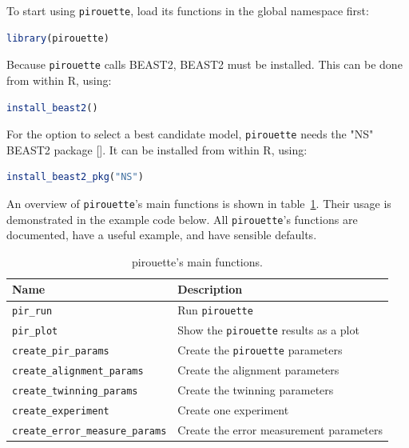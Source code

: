 \documentclass{article}
\begin{document}
To start using \verb;pirouette;, load its functions in the global namespace 
first:

\begin{lstlisting}[language=R, floatplacement=ht, frame=single]
library(pirouette)
\end{lstlisting}
Because \verb;pirouette; calls BEAST2, BEAST2 must be installed. 
This can be done from within R, using:

\begin{lstlisting}[language=R, floatplacement=ht, frame=single]
install_beast2()
\end{lstlisting}
For the option to select a best candidate model,
\verb;pirouette; needs the "NS" BEAST2 package [\cite{maturana2018model}].
It can be installed from within R, using:

\begin{lstlisting}[language=R, floatplacement=ht, frame=single]
install_beast2_pkg("NS")
\end{lstlisting}

An overview of \verb;pirouette;'s main functions is shown in 
table~\ref{tab:functions}. 
Their usage is demonstrated in the example code below.
All \verb;pirouette;'s functions are documented,
have a useful example, and have sensible defaults.

\begin{table}[h]
  \centering
  \begin{tabular}{ | l | l | }
    \hline
    \textbf{Name} & \textbf{Description} \\
    \hline
    \verb;pir_run; & Run \verb;pirouette; \\
    \verb;pir_plot; & Show the \verb;pirouette; results as a plot \\
    \verb;create_pir_params; & Create the \verb;pirouette; parameters \\
    \hline
    \verb;create_alignment_params; & Create the alignment parameters \\
    \verb;create_twinning_params; & Create the twinning parameters \\
    \verb;create_experiment; & Create one experiment \\
    \verb;create_error_measure_params; & Create the error measurement parameters \\
    \hline
  \end{tabular}
  \caption{pirouette's main functions.}
  \label{tab:functions}
\end{table}
\end{document}
